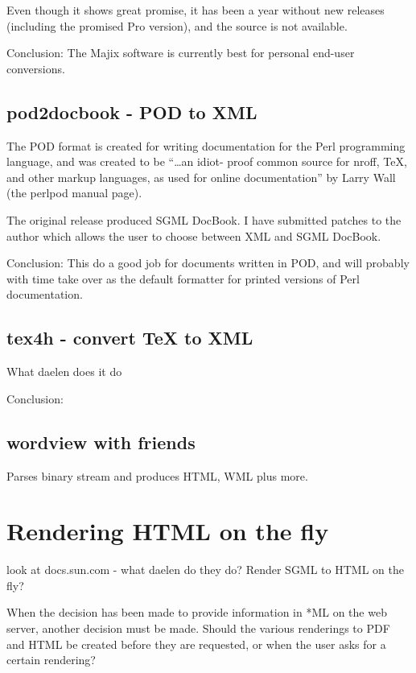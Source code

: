 Even though it shows great promise, it has been a year without new
releases (including the promised Pro version), and the source is not
available. 

Conclusion: The Majix software is currently best for personal end-user
conversions.


\subsection{pod2docbook - POD to XML}

The POD format is created for writing documentation for the Perl
programming language, and was created to be ``\ldots an idiot- proof
common source for nroff, TeX, and other markup languages, as used for
online documentation'' by Larry Wall (\textsf{the perlpod manual
  page}).
       
The original release produced SGML DocBook.  I have submitted patches
to the author which allows the user to choose between XML and SGML
DocBook.

Conclusion:  This do a good job for documents written in POD, and will
probably with time take over as the default formatter for printed
versions of Perl documentation.

\subsection{tex4h - convert {\TeX} to XML}

\textsf{What daelen does it do}      
      
\textsf{Conclusion:}

\subsection{wordview with friends}

\textsf{Parses binary stream and produces HTML, WML plus more.  }


\section{Rendering HTML on the fly}

\textsf{look at docs.sun.com - what daelen do they do?  Render SGML to
  HTML on the fly?}

When the decision has been made to provide information in *ML on the
web server, another decision must be made.  Should the various
renderings to PDF and HTML be created before they are requested, or
when the user asks for a certain rendering?

